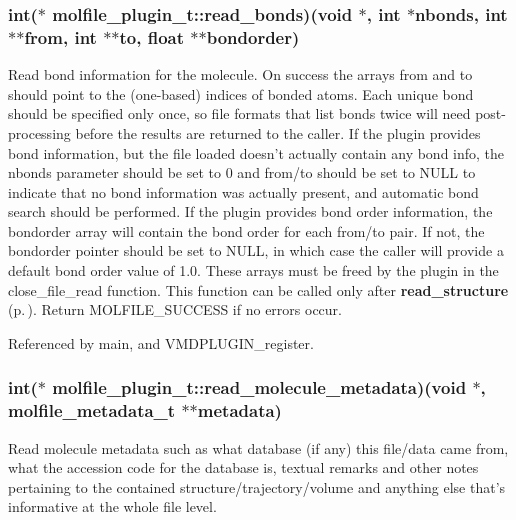 \subsubsection{\setlength{\rightskip}{0pt plus 5cm}int($\ast$ molfile\_\-plugin\_\-t::read\_\-bonds)(void $\ast$, int $\ast$nbonds, int $\ast$$\ast$from, int $\ast$$\ast$to, float $\ast$$\ast$bondorder)}\label{structmolfile__plugin__t_m3}


Read bond information for the molecule. On success the arrays from and to should point to the (one-based) indices of bonded atoms. Each unique bond should be specified only once, so file formats that list bonds twice will need post-processing before the results are returned to the caller. If the plugin provides bond information, but the file loaded doesn't  actually contain any bond info, the nbonds parameter should be set to 0 and from/to should be set to NULL to indicate that no bond information was actually present, and automatic bond search should be performed.  If the plugin provides bond order information, the bondorder array will contain the bond order for each from/to pair. If not, the bondorder pointer should be set to NULL, in which case the caller will provide a  default bond order value of 1.0. These arrays must be freed by the plugin in the close\_\-file\_\-read function. This function can be called only after {\bf read\_\-structure} {\rm (p.\,\pageref{structmolfile__plugin__t_m2})}.  Return MOLFILE\_\-SUCCESS if no errors occur. 

Referenced by main, and VMDPLUGIN\_\-register.
\subsubsection{\setlength{\rightskip}{0pt plus 5cm}int($\ast$  molfile\_\-plugin\_\-t::read\_\-molecule\_\-metadata)(void $\ast$, {\bf molfile\_\-metadata\_\-t} $\ast$$\ast$metadata)}\label{structmolfile__plugin__t_m13}


Read molecule metadata such as what database (if any) this file/data came from, what the accession code for the database is, textual remarks and other notes pertaining to the contained structure/trajectory/volume and anything else that's informative at the whole file level. 
